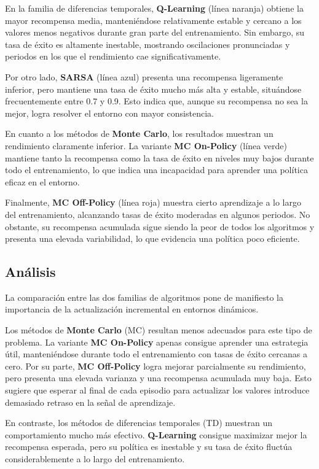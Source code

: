 En la familia de diferencias temporales, \textbf{Q-Learning} (línea naranja) obtiene la mayor recompensa media, manteniéndose relativamente estable y cercano a los valores menos negativos durante gran parte del entrenamiento. Sin embargo, su tasa de éxito es altamente inestable, mostrando oscilaciones pronunciadas y periodos en los que el rendimiento cae significativamente.

Por otro lado, \textbf{SARSA} (línea azul) presenta una recompensa ligeramente inferior, pero mantiene una tasa de éxito mucho más alta y estable, situándose frecuentemente entre 0.7 y 0.9. Esto indica que, aunque su recompensa no sea la mejor, logra resolver el entorno con mayor consistencia.

En cuanto a los métodos de \textbf{Monte Carlo}, los resultados muestran un rendimiento claramente inferior. La variante \textbf{MC On-Policy} (línea verde) mantiene tanto la recompensa como la tasa de éxito en niveles muy bajos durante todo el entrenamiento, lo que indica una incapacidad para aprender una política eficaz en el entorno.

Finalmente, \textbf{MC Off-Policy} (línea roja) muestra cierto aprendizaje a lo largo del entrenamiento, alcanzando tasas de éxito moderadas en algunos periodos. No obstante, su recompensa acumulada sigue siendo la peor de todos los algoritmos y presenta una elevada variabilidad, lo que evidencia una política poco eficiente.

\subsection{Análisis}

La comparación entre las dos familias de algoritmos pone de manifiesto la importancia de la actualización incremental en entornos dinámicos.

Los métodos de \textbf{Monte Carlo} (MC) resultan menos adecuados para este tipo de problema. La variante \textbf{MC On-Policy} apenas consigue aprender una estrategia útil, manteniéndose durante todo el entrenamiento con tasas de éxito cercanas a cero. Por su parte, \textbf{MC Off-Policy} logra mejorar parcialmente su rendimiento, pero presenta una elevada varianza y una recompensa acumulada muy baja. Esto sugiere que esperar al final de cada episodio para actualizar los valores introduce demasiado retraso en la señal de aprendizaje.

En contraste, los métodos de diferencias temporales (TD) muestran un comportamiento mucho más efectivo. \textbf{Q-Learning} consigue maximizar mejor la recompensa esperada, pero su política es inestable y su tasa de éxito fluctúa considerablemente a lo largo del entrenamiento.

